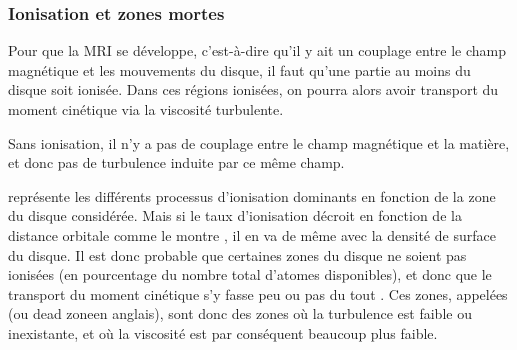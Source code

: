 \subsubsection{Ionisation et zones mortes}\label{sec:ionisation_DZ}
Pour que la MRI se développe, c'est-à-dire qu'il y ait un couplage entre le champ magnétique et les mouvements du disque, il
faut qu'une partie au moins du disque soit ionisée. Dans ces régions ionisées, on pourra alors avoir transport du moment
cinétique via la viscosité turbulente. 

\bigskip

Sans ionisation, il n'y a pas de couplage entre le champ magnétique et la matière, et donc pas de turbulence induite par ce même champ. 

 représente les différents processus d'ionisation dominants en fonction de la zone du disque considérée.
Mais si le taux d'ionisation décroit en fonction de la distance orbitale \citep{ilgner2006ionisation1} comme le montre
, il en va de même avec la densité de surface du disque. Il est donc probable que certaines zones
du disque ne soient pas ionisées (en pourcentage du nombre total d'atomes disponibles), et donc que le transport du moment
cinétique s'y fasse peu ou pas du tout \citep{gammie1996layered}. Ces zones, appelées  (ou \og
dead zone\fg en anglais), sont donc des zones où
la turbulence est faible ou inexistante, et où la viscosité est par conséquent beaucoup plus faible. 

